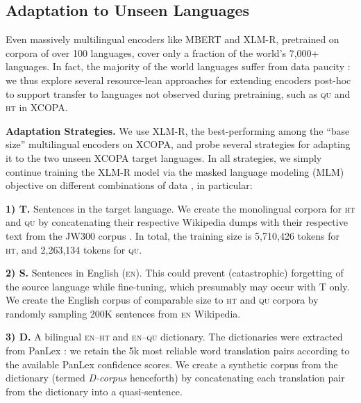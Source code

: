 \documentclass[11pt,a4paper]{article}
\begin{document}
\subsection{Adaptation to Unseen Languages}
\label{s:extension}
Even massively multilingual encoders like MBERT and XLM-R, pretrained on corpora of over 100 languages, cover only a fraction of the world's 7,000+ languages. In fact, the majority of the world languages suffer from data paucity \citep{kornai2013digital}: we thus explore several resource-lean approaches for extending encoders post-hoc to support transfer to languages not observed during pretraining, such as \textsc{qu} and \textsc{ht} in XCOPA.



\vspace{1.5mm}
\noindent \textbf{Adaptation Strategies.}
We use XLM-R, the best-performing among the ``base size'' multilingual encoders on XCOPA, and probe several strategies for adapting it to the two unseen XCOPA target languages. In all strategies, we simply continue training the XLM-R model via the masked language modeling (MLM) objective on different combinations of data \cite{Pfeiffer:2020emnlp}, in particular:

\vspace{1.4mm}
\noindent \textbf{1) T.} Sentences in the target language. We create the monolingual corpora for \textsc{ht} and \textsc{qu} by concatenating their respective Wikipedia dumps with their respective text from the JW300 corpus \cite{agic-vulic-2019-jw300}. In total, the training size is 5,710,426 tokens for \textsc{ht}, and 2,263,134 tokens for \textsc{qu}.
\vspace{1.3mm}








\noindent \textbf{2) S.} Sentences in English (\textsc{en}). This could prevent (catastrophic) forgetting of the source language while fine-tuning, which presumably may occur with T only. We create the English corpus of comparable size to \textsc{ht} and \textsc{qu} corpora by randomly sampling 200K sentences from \textsc{en} Wikipedia.



\vspace{1.3mm}
\noindent \textbf{3) D.} A bilingual \textsc{en--ht} and \textsc{en--qu} dictionary. The dictionaries were extracted from PanLex \cite{kamholz-etal-2014-panlex}: we retain the 5k most reliable word translation pairs according to the available PanLex confidence scores. We create a synthetic corpus from the dictionary (termed \textit{D-corpus} henceforth) by concatenating each translation pair from the dictionary into a quasi-sentence. 
\end{document}
